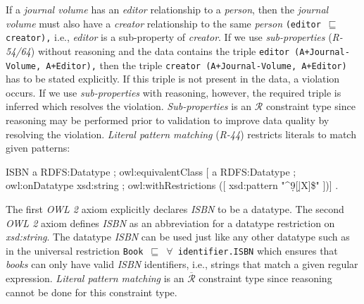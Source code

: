 \documentclass{acm_proc_article-sp}
\newcommand{\ms}[1]{%
  \texttt{#1}
}
\newcommand{\tb}[1]{\todo[size=\small, color=green!40]{\textbf{Thomas:} #1}}
\newcommand{\er}[1]{\todo[size=\small, color=red!40]{\textbf{Erman:} #1}}
\begin{document}
If a \emph{journal volume} has an {\em editor} relationship to a \emph{person}, 
then the \emph{journal volume} must also have a {\em creator} relationship to the same \emph{person} {\small\ms{(editor $\sqsubseteq$ creator),}}i.e., 
\emph{editor} is a sub-property of \emph{creator}.
If we use \emph{sub-properties} (\emph{R-54/64}) without reasoning and the data contains the triple {\small\ms{editor (A+Journal-Volume, A+Editor),}}
then the triple {\small\ms{creator (A+Journal-Volume, A+Editor)}} has to be stated explicitly.
If this triple is not present in the data, a violation occurs.
If we use \emph{sub-properties} with reasoning, however, the required triple is inferred which resolves the violation.
{\em Sub-properties} is an $\mathcal{R}$ constraint type 
since reasoning may be performed prior to validation to improve data quality by resolving the violation.
{\em Literal pattern matching} (\emph{R-44}) restricts literals to match given patterns:
\begin{ex}
ISBN a RDFS:Datatype ; owl:equivalentClass [ a RDFS:Datatype ;
    owl:onDatatype xsd:string ; 
    owl:withRestrictions ([ xsd:pattern "^\d{9}[\d|X]\$" ])] .
\end{ex}

The first \emph{OWL 2} axiom explicitly declares {\em ISBN} to be a datatype. %
The second \emph{OWL 2} axiom defines {\em ISBN} as an abbreviation for a datatype restriction on {\em xsd:string}. 
The datatype {\em ISBN} can be used just like any other datatype such as in
the universal restriction {\small\ms{Book $\sqsubseteq$ $\forall$ identifier.ISBN}} which ensures that \emph{books} can only have valid \emph{ISBN} identifiers, 
i.e., strings that match a given regular expression. 
{\em Literal pattern matching} is an $\overline{\mathcal{R}}$ constraint type since reasoning cannot be done for this constraint type.
\end{document}
